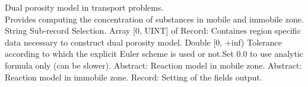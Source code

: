 \begin{RecordType}
	{}
	{} %
	{} %
	{} %
	{{{Dual porosity model in transport problems.}\\{
Provides computing the concentration of substances in mobile and immobile zone.}}}
		\KeyItem
			{}
			{{String}}
			{\textrangle}
			{} %
			{{{Sub-record Selection.}}}
		\KeyItem
			{}
			{{Array [0, UINT] of }{Record}{: }}
			{\textrangle}
			{} %
			{{{Containes region specific data necessary to construct dual porosity model.}}}
		\KeyItem
			{}
			{{Double [0, +inf)}}
			{\textrangle}
			{} %
			{{{Tolerance according to which the explicit Euler scheme is used or not.Set 0.0 to use analytic formula only (can be slower).}}}
		\KeyItem
			{}
			{{Abstract}{: }}
			{\textrangle}
			{} %
			{{{Reaction model in mobile zone.}}}
		\KeyItem
			{}
			{{Abstract}{: }}
			{\textrangle}
			{} %
			{{{Reaction model in immobile zone.}}}
		\KeyItem
			{}
			{{Record}{: }}
			{\textrangle}
			{} %
			{{{Setting of the fields output.}}}
\end{RecordType}
